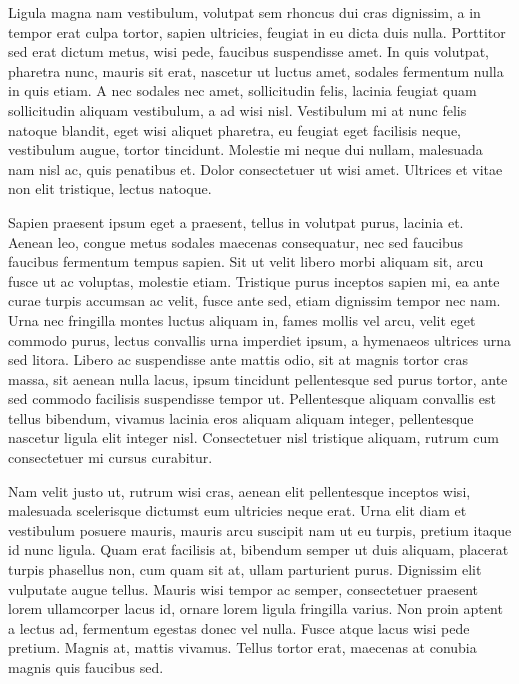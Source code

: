 \begin{singlespace}
\im
Ligula magna nam vestibulum, volutpat sem rhoncus dui cras dignissim, a in tempor erat culpa tortor, sapien ultricies, feugiat in eu dicta duis nulla.
Porttitor sed erat dictum metus, wisi pede, faucibus suspendisse amet.
In quis volutpat, pharetra nunc, mauris sit erat, nascetur ut luctus amet, sodales fermentum nulla in quis etiam.
A nec sodales nec amet, sollicitudin felis, lacinia feugiat quam sollicitudin aliquam vestibulum, a ad wisi nisl.
Vestibulum mi at nunc felis natoque blandit, eget wisi aliquet pharetra, eu feugiat eget facilisis neque, vestibulum augue, tortor tincidunt.
Molestie mi neque dui nullam, malesuada nam nisl ac, quis penatibus et.
Dolor consectetuer ut wisi amet.
Ultrices et vitae non elit tristique, lectus natoque.
\end{singlespace}

\begin{singlespace}
\im
Sapien praesent ipsum eget a praesent, tellus in volutpat purus, lacinia et.
Aenean leo, congue metus sodales maecenas consequatur, nec sed faucibus faucibus fermentum tempus sapien.
Sit ut velit libero morbi aliquam sit, arcu fusce ut ac voluptas, molestie etiam.
Tristique purus inceptos sapien mi, ea ante curae turpis accumsan ac velit, fusce ante sed, etiam dignissim tempor nec nam.
Urna nec fringilla montes luctus aliquam in, fames mollis vel arcu, velit eget commodo purus, lectus convallis urna imperdiet ipsum, a hymenaeos ultrices urna sed litora.
Libero ac suspendisse ante mattis odio, sit at magnis tortor cras massa, sit aenean nulla lacus, ipsum tincidunt pellentesque sed purus tortor, ante sed commodo facilisis suspendisse tempor ut.
Pellentesque aliquam convallis est tellus bibendum, vivamus lacinia eros aliquam aliquam integer, pellentesque nascetur ligula elit integer nisl.
Consectetuer nisl tristique aliquam, rutrum cum consectetuer mi cursus curabitur.
\end{singlespace}

\begin{singlespace}
\im
Nam velit justo ut, rutrum wisi cras, aenean elit pellentesque inceptos wisi, malesuada scelerisque dictumst eum ultricies neque erat.
Urna elit diam et vestibulum posuere mauris, mauris arcu suscipit nam ut eu turpis, pretium itaque id nunc ligula.
Quam erat facilisis at, bibendum semper ut duis aliquam, placerat turpis phasellus non, cum quam sit at, ullam parturient purus.
Dignissim elit vulputate augue tellus.
Mauris wisi tempor ac semper, consectetuer praesent lorem ullamcorper lacus id, ornare lorem ligula fringilla varius.
Non proin aptent a lectus ad, fermentum egestas donec vel nulla.
Fusce atque lacus wisi pede pretium.
Magnis at, mattis vivamus.
Tellus tortor erat, maecenas at conubia magnis quis faucibus sed.
\end{singlespace}

